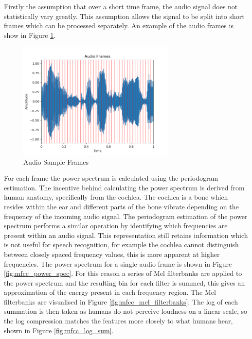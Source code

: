 Firstly the assumption that over a short time frame, the audio signal does not statistically vary greatly.
This assumption allows the signal to be split into short frames which can be processed separately.
An example of the audio frames is show in Figure \ref{fig:mfcc_audio_frames}.

\begin{figure}[h!]
    \centering
        \includegraphics[width=0.7\textwidth]{figures/mfcc/audio_frames.png}
    \caption{Audio Sample Frames}\label{fig:mfcc_audio_frames}
\end{figure} 

For each frame the power spectrum is calculated using the periodogram estimation.  
The incentive behind calculating the power spectrum is derived from human anatomy, specifically from the cochlea.
The cochlea is a bone which resides within the ear and different parts of the bone vibrate depending on the frequency of the incoming audio signal.
The periodogram estimation of the power spectrum performs a similar operation by identifying which frequencies are present within an audio signal.
This representation still retains information which is not useful for speech recognition, for example the cochlea cannot distinguish between closely spaced frequency values, this is more apparent at higher frequencies.
The power spectrum for a single audio frame is shown in Figure \ref{fig:mfcc_power_spec}.
For this reason a series of Mel filterbanks are applied to the power spectrum and the resulting bin for each filter is summed, this gives an approximation of the energy present in each frequency region.
The Mel filterbanks are visualised in Figure \ref{fig:mfcc_mel_filterbanks}.
The log of each summation is then taken as humans do not perceive loudness on a linear scale, so the log compression matches the features more closely to what humans hear, shown in Figure \ref{fig:mfcc_log_sum}.

